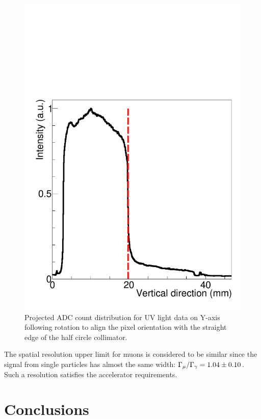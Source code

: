 \documentclass[preprint,3p,twocolumn]{elsarticle}
\begin{document}
\begin{figure}[tbp]
    \centering
	\includegraphics[width=\columnwidth]{figure/edge_image_w_uv_4_BH_axis.pdf}
	\caption{Projected ADC count distribution for UV light
          data on Y-axis following rotation to align the pixel
          orientation with the straight edge of the half circle
          collimator.}
	\label{fig:half_circle}
\end{figure}

The spatial resolution upper limit for muons is considered to be
similar since the signal from single particles has almost
the same width:
$\Gamma_{\mu} / \Gamma_{\gamma} = \num{1.04 \pm 0.10}$.  Such a
resolution satisfies the accelerator requirements.

\section{Conclusions}
\end{document}
